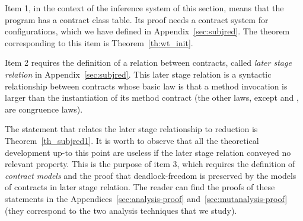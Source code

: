 Item 1, in the context of the inference system of this section, means that the 
program has a contract class table. Its proof needs a contract system for configurations, which we have defined in Appendix~\ref{sec:subjred}. The theorem
corresponding to this item is Theorem~\ref{th:wt_init}.

Item 2 requires the definition of a relation between contracts, called \emph{later stage
relation} in Appendix~\ref{sec:subjred}.
This later stage relation is a syntactic relationship between contracts
whose basic law is that a method invocation is larger than the 
instantiation of its method contract (the other laws, except  and , are congruence laws). 


The statement
that relates the later stage relationship to {\coreABS} reduction is Theorem~\ref{th_subjred1}. It is worth to observe that all the theoretical development up-to this point are useless if the 
later stage relation conveyed no relevant property. 
This is the purpose of item 3, which requires the definition of \emph{contract models} and the proof that deadlock-freedom is preserved by the models of contracts in 
later stage relation. The reader can find the proofs of these statements in the
Appendices~\ref{sec:analysis-proof} and~\ref{sec:mutanalysis-proof} (they correspond
to the two analysis techniques that we study).





